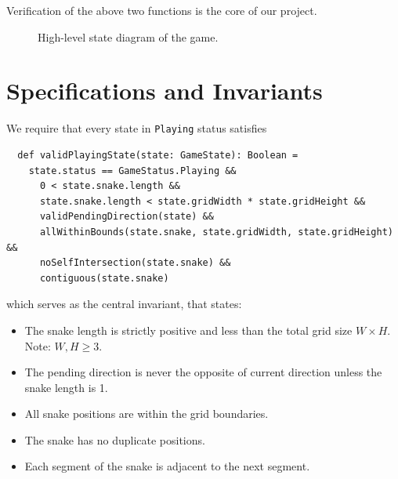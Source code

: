 \documentclass[letterpaper, 11pt]{article}
\begin{document}
Verification of the above two functions is the core of our project.

\begin{figure}[ht]
    \centering
    \caption{High-level state diagram of the game.}
    \label{fig:status}
\end{figure}


\section{Specifications and Invariants}
We require that every state in \texttt{Playing} status satisfies
\begin{verbatim}
  def validPlayingState(state: GameState): Boolean =
    state.status == GameStatus.Playing &&
      0 < state.snake.length &&
      state.snake.length < state.gridWidth * state.gridHeight &&
      validPendingDirection(state) &&
      allWithinBounds(state.snake, state.gridWidth, state.gridHeight) &&
      noSelfIntersection(state.snake) &&
      contiguous(state.snake)
\end{verbatim}
which serves as the central invariant, that states:
\begin{itemize}
    \item The snake length is strictly positive and less than the total grid size $W \times H$.
        Note: $W, H \geqslant 3$.
    \item The pending direction is never the opposite of current direction unless the snake length
        is 1.
    \item All snake positions are within the grid boundaries.
    \item The snake has no duplicate positions.
    \item Each segment of the snake is adjacent to the next segment.
\end{itemize}
\end{document}

